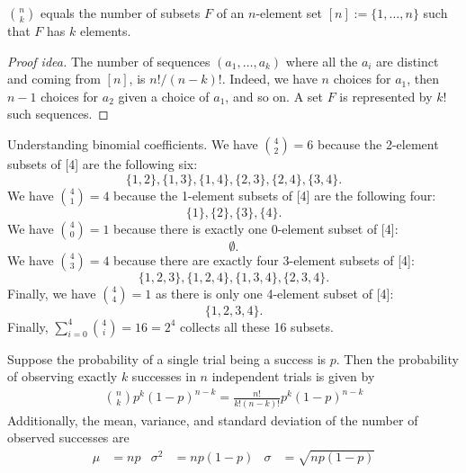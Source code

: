 \begin{thm}
$\binom{n}{k}$ equals the number of subsets $F$ of an $n$-element set $[n]:=\{1,\dots,n\}$ such that $F$ has $k$ elements.
\end{thm}
\begin{proof}[Proof idea]
The number of sequences $(a_1,\dots,a_k)$ where all the $a_i$ are distinct and coming from $[n]$, is $n!/(n-k)!$. Indeed, we have $n$ choices for $a_1$, then $n-1$ choices for $a_2$ given a choice of $a_1$, and so on. A set $F$ is represented by $k!$ such sequences.
\end{proof}
\begin{example}{Understanding binomial coefficients.}
We have $\binom42=6$ because the 2-element subsets of [4] are the following six:
\[
	\{1,2\}, \{1,3\}, \{1,4\}, \{2,3\}, \{2,4\}, \{3,4\}.
\]
We have $\binom41=4$ because the 1-element subsets of [4] are the following four:
\[
	\{1\}, \{2\}, \{3\}, \{4\}.
\]
We have $\binom40=1$ because there is exactly one 0-element subset of [4]:
\[
	\emptyset.
\]
We have $\binom43=4$ because there are exactly four 3-element subsets of [4]:
\[
	\{1,2,3\}, \{1,2,4\}, \{1,3,4\}, \{2,3,4\}.
\]
Finally, we have $\binom44=1$ as there is only one 4-element subset of [4]:
\[
	\{1,2,3,4\}.
\]
Finally, $\sum_{i=0}^4\binom4i=16=2^4$ collects all these 16 subsets.
\end{example}

\begin{termBox}{ Suppose the probability of a single trial being a success is $p$. Then the probability of observing exactly $k$ successes in $n$ independent trials is given by\vspace{-1mm}
\begin{eqnarray}
{n\choose k}p^k(1-p)^{n-k} = \frac{n!}{k!(n-k)!}p^k(1-p)^{n-k}
\label{binomialFormula}
\end{eqnarray}
Additionally, the mean, variance, and standard deviation of the number of observed successes are\vspace{-2mm}
\begin{align}
\mu &= np
	&\sigma^2 &= np(1-p)
	&\sigma &= \sqrt{np(1-p)}
\label{binomialStats}
\end{align}}
\end{termBox}



\label{normalApproxBinomialDistSubsection}

